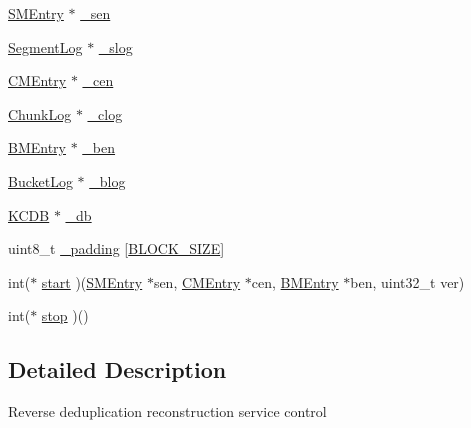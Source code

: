 \begin{DoxyCompactItemize}
\item 
\hyperlink{structSMEntry}{\-S\-M\-Entry} $\ast$ \hyperlink{structRevRbdService_a87df01a0edb89ffa2c5c4687c06cf1c4}{\-\_\-sen}
\item 
\hyperlink{structSegmentLog}{\-Segment\-Log} $\ast$ \hyperlink{structRevRbdService_a9f791b31a7c3d79b24a18fde43073021}{\-\_\-slog}
\item 
\hyperlink{structCMEntry}{\-C\-M\-Entry} $\ast$ \hyperlink{structRevRbdService_a0c9cd164272c0bbda1ff1927a431c669}{\-\_\-cen}
\item 
\hyperlink{structChunkLog}{\-Chunk\-Log} $\ast$ \hyperlink{structRevRbdService_a561761326f6c87f2cc091a9ecf7cc791}{\-\_\-clog}
\item 
\hyperlink{structBMEntry}{\-B\-M\-Entry} $\ast$ \hyperlink{structRevRbdService_ab7bd304aa0624565ed60190a286c8669}{\-\_\-ben}
\item 
\hyperlink{structBucketLog}{\-Bucket\-Log} $\ast$ \hyperlink{structRevRbdService_a1528c84cc4d8ad6bcfc43d26e6231168}{\-\_\-blog}
\item 
\hyperlink{structKCDB}{\-K\-C\-D\-B} $\ast$ \hyperlink{structRevRbdService_a59cc8867465a33e67d00056131dc6978}{\-\_\-db}
\item 
uint8\-\_\-t \hyperlink{structRevRbdService_ab230216146da706c857f624be7a73230}{\-\_\-padding} \mbox{[}\hyperlink{revdedup_8h_ad51ded0bbd705f02f73fc60c0b721ced}{\-B\-L\-O\-C\-K\-\_\-\-S\-I\-Z\-E}\mbox{]}
\item 
int($\ast$ \hyperlink{structRevRbdService_a3cdfc8be89e3616f779de9aff0aed142}{start} )(\hyperlink{structSMEntry}{\-S\-M\-Entry} $\ast$sen, \hyperlink{structCMEntry}{\-C\-M\-Entry} $\ast$cen, \hyperlink{structBMEntry}{\-B\-M\-Entry} $\ast$ben, uint32\-\_\-t ver)
\item 
int($\ast$ \hyperlink{structRevRbdService_a362fe31c290a6fcedd4a0af6b6e2425c}{stop} )()
\end{DoxyCompactItemize}


\subsection{\-Detailed \-Description}
\-Reverse deduplication reconstruction service control 


